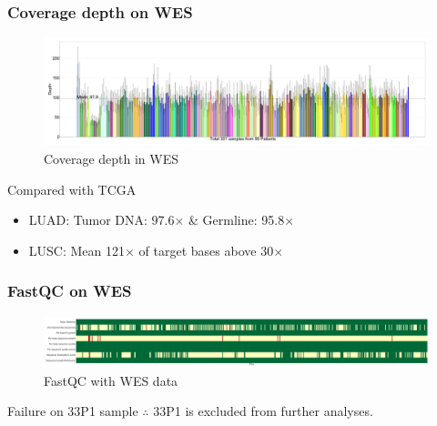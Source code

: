 \documentclass{beamer}
\begin{document}
            \begin{frame}
                \frametitle{Coverage depth on WES}

                \begin{figure}
                    \includegraphics[width=0.9 \linewidth]{figures/FastQC/BWA.pdf}
                    \caption{Coverage depth in WES}
                \end{figure}

                \begin{block}{Compared with TCGA}
                    \begin{itemize}
                        \item LUAD: Tumor DNA: 97.6$\times$ \& Germline: 95.8$\times$ \cite{LUAD-01}
                        \item LUSC: Mean 121$\times$ of target bases above 30$\times$ \cite{LUSC-01}
                    \end{itemize}
                \end{block}
            \end{frame}

            \begin{frame}
                \frametitle{FastQC on WES}

                \begin{figure}
                    \includegraphics[width=0.9 \linewidth]{figures/FastQC/FastQC_WES.pdf}
                    \caption{FastQC with WES data}
                \end{figure}

                \begin{alertblock}{Failure on 33P1 sample}
                    $\therefore$ 33P1 is excluded from further analyses.
                \end{alertblock}
            \end{frame}
\end{document}
